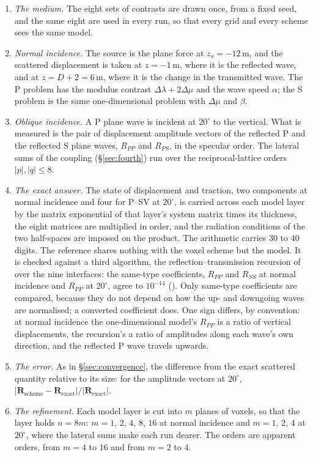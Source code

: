 \documentclass[preprint,review,12pt]{elsarticle}
\begin{document}
\begin{enumerate}
\item \emph{The medium.} The eight sets of contrasts are drawn once, from a fixed seed, and the same
eight are used in every run, so that every grid and every scheme sees the same model.
\item \emph{Normal incidence.} The source is the plane force at $z_s=-12$\,m, and the scattered
displacement is taken at $z=-1$\,m, where it is the reflected wave, and at $z=D+2=6$\,m, where it is
the change in the transmitted wave. The P problem has the modulus contrast
$\Delta\lambda+2\Delta\mu$ and the wave speed $\alpha$; the S problem is the same one-dimensional
problem with $\Delta\mu$ and $\beta$.
\item \emph{Oblique incidence.} A P plane wave is incident at $20^\circ$ to the vertical. What is
measured is the pair of displacement amplitude vectors of the reflected P and the reflected S plane
waves, $R_{PP}$ and $R_{PS}$, in the specular order. The lateral sums of the coupling
(\S\ref{sec:fourth}) run over the reciprocal-lattice orders $\lvert p\rvert,\lvert q\rvert\le8$.
\item \emph{The exact answer.} The state of displacement and traction, two components at normal
incidence and four for P--SV at $20^\circ$, is carried across each model layer by the matrix
exponential of that layer's system matrix times its thickness, the eight matrices are multiplied in
order, and the radiation conditions of the two half-spaces are imposed on the product. The arithmetic
carries $30$ to $40$ digits. The reference shares nothing with the voxel scheme but the model. It is
checked against a third algorithm, the reflection--transmission recursion of \citet{Kennett1983} over
the nine interfaces: the same-type coefficients, $R_{PP}$ and $R_{SS}$ at normal incidence and $R_{PP}$
at $20^\circ$, agree to $10^{-14}$ (). Only
same-type coefficients are compared, because they do not depend on how the up- and downgoing waves are
normalised; a converted coefficient does. One sign differs, by convention: at normal incidence the
one-dimensional model's $R_{PP}$ is a ratio of vertical displacements, the recursion's a ratio of
amplitudes along each wave's own direction, and the reflected P wave travels upwards.
\item \emph{The error.} As in \S\ref{sec:convergence}, the difference from the exact scattered
quantity relative to its size: for the amplitude vectors at $20^\circ$,
$\lvert\mathbf{R}_{\text{scheme}}-\mathbf{R}_{\text{exact}}\rvert/\lvert\mathbf{R}_{\text{exact}}\rvert$.
\item \emph{The refinement.} Each model layer is cut into $m$ planes of voxels, so that the layer
holds $n=8m$: $m=1$, $2$, $4$, $8$, $16$ at normal incidence and $m=1$, $2$, $4$ at $20^\circ$, where the
lateral sums make each run dearer. The orders are apparent orders, from $m=4$ to $16$ and from $m=2$ to
$4$.
\end{enumerate}
\end{document}
